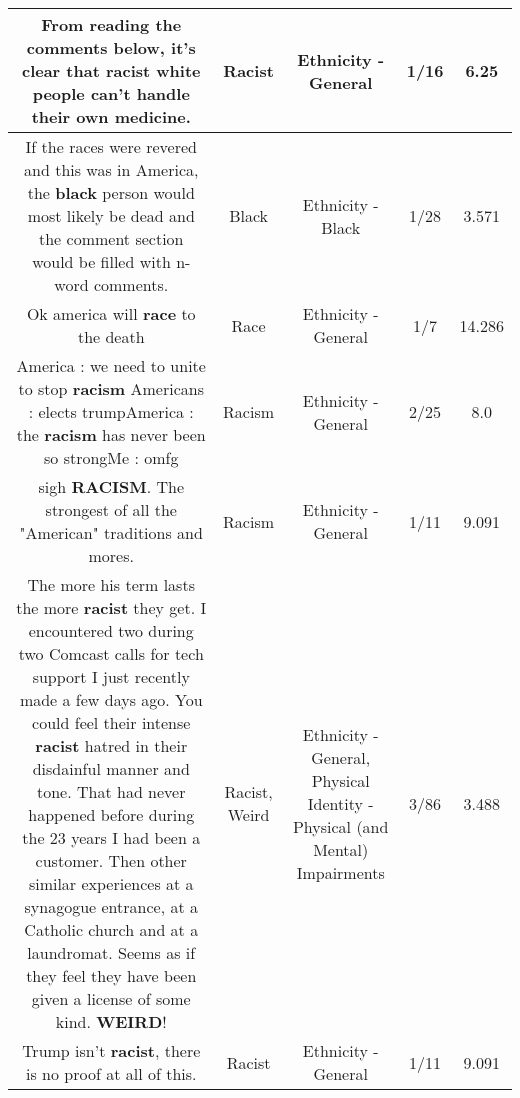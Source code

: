 \documentclass[11pt]{article}
\newlength\mylength
\begin{document}
\begin{center}
\begin{longtable}{|C{.65\mylength}|C{.30\mylength}|C{.12\mylength}|C{.12\mylength}|C{.12\mylength}|}
  \small From reading the comments below, it's clear that \textbf{racist} white people can't handle their own medicine.\normalsize   & Racist & Ethnicity - General & 1/16 & 6.25 \\  \hline
  \small If the races were revered and this was in America, the \textbf{black} person would most likely be dead and the comment section would be filled with n-word comments.\normalsize   & Black & Ethnicity - Black & 1/28 & 3.571 \\  \hline
  \small Ok america will \textbf{race} to the death\normalsize   & Race & Ethnicity - General & 1/7 & 14.286 \\  \hline
  \small America : we need to unite to stop \textbf{racism} Americans : elects trumpAmerica : the \textbf{racism} has never been so strongMe : omfg\normalsize   & Racism & Ethnicity - General & 2/25 & 8.0 \\  \hline
  \small sigh \textbf{RACISM}. The strongest of all the "American"  traditions and mores.\normalsize   & Racism & Ethnicity - General & 1/11 & 9.091 \\  \hline
  \small The more his term lasts the more \textbf{racist} they get. I encountered two during two Comcast calls for tech support I just recently made a few days ago. You could feel their intense \textbf{racist} hatred in their disdainful manner and tone. That had never happened before during the 23 years I had been a customer. Then other similar experiences  at a synagogue entrance, at a Catholic church and at a laundromat.  Seems as if they feel they have been given a license of some kind. \textbf{WEIRD}!\normalsize   & Racist, Weird & Ethnicity - General, Physical Identity - Physical (and Mental) Impairments & 3/86 & 3.488 \\  \hline
  \small Trump isn't \textbf{racist}, there is no proof at all of this.\normalsize   & Racist & Ethnicity - General & 1/11 & 9.091 \\  \hline

\end{longtable}
\end{center}
\end{document}
